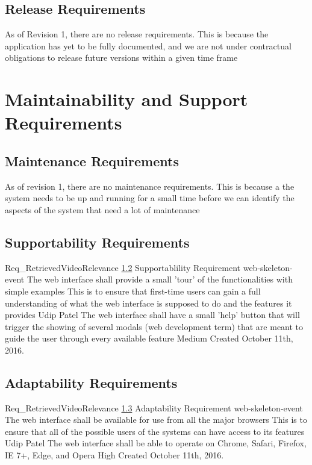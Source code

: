 \documentclass{scrreprt}
\begin{document}
\subsection{Release Requirements}
\label{req-release}
As of Revision 1, there are no release requirements. This is because the application has yet to be fully documented, and we are not under contractual obligations to release future versions within a given time frame


\section{Maintainability and Support Requirements}

\subsection{Maintenance Requirements}
\label{req-maintenance}

As of revision 1, there are no maintenance requirements. This is because a the system needs to be up and running for a small time before we can identify the aspects of the system that need a lot of maintenance

\subsection{Supportability Requirements}
\label{req-supportability}

\requirement
{Req_RetrievedVideoRelevance}
{\ref{req-supportability} Supportablility Requirement}
{web-skeleton-event}
{The web interface shall provide a small 'tour' of the functionalities with simple examples}
{This is to ensure that first-time users can gain a full understanding of what the web interface is supposed to do and the features it provides}
{Udip Patel}
{The web interface shall have a small 'help' button that will trigger the showing of several modals (web development term) that are meant to guide the user through every available feature}
{Medium}
{Created October 11th, 2016.}


\subsection{Adaptability Requirements}
\label{req-adaptability}

\requirement
{Req_RetrievedVideoRelevance}
{\ref{req-adaptability} Adaptability Requirement}
{web-skeleton-event}
{The web interface shall be available for use from all the major browsers}
{This is to ensure that all of the possible users of the systems can have access to its features}
{Udip Patel}
{The web interface shall be able to operate on Chrome, Safari, Firefox, IE 7+, Edge, and Opera}
{High}
{Created October 11th, 2016.}
\end{document}
